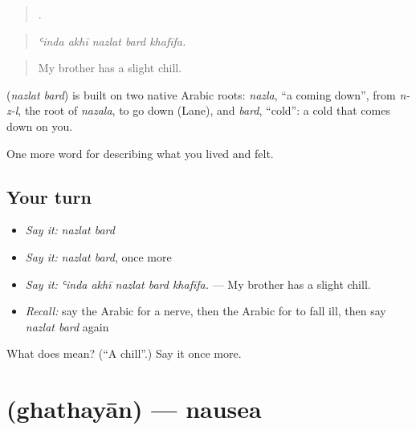 \begin{quote}
    .
\end{quote}

\begin{quote}
\emph{ʿinda akhī nazlat bard khafīfa.}
\end{quote}

\begin{quote}
My brother has a slight chill.
\end{quote}

\begin{cousinweb}
\textbf{ } (\emph{nazlat bard}) is built on two native Arabic roots: \emph{nazla}, \textquotedblleft{}a coming down\textquotedblright{}, from \emph{n-z-l}, the root of \emph{nazala}, to go down (Lane), and \emph{bard}, \textquotedblleft{}cold\textquotedblright{}: a cold that comes down on you.
\end{cousinweb}

\begin{grammarlens}[title={What you've built}]
One more word for describing what you lived and felt.
\end{grammarlens}

\subsection*{Your turn}
\begin{itemize}
\raggedright
  \item \emph{Say it:} \emph{nazlat bard}
  \item \emph{Say it:} \emph{nazlat bard}, once more
  \item \emph{Say it:} \emph{ʿinda akhī nazlat bard khafīfa.} — My brother has a slight chill.
  \item \emph{Recall:} say the Arabic for a nerve, then the Arabic for to fall ill, then say \emph{nazlat bard} again
\end{itemize}

\begin{tcolorbox}[breakable,colback=teal!4,colframe=teal!35!black,title={Before you move on}]
What does   mean? (\textquotedblleft{}A chill\textquotedblright{}.) Say it once more.
\end{tcolorbox}
\section[\texorpdfstring{\ar{غثيان} (ghathayān)}{غثيان (ghathayān)}]{ (ghathayān) — nausea}

